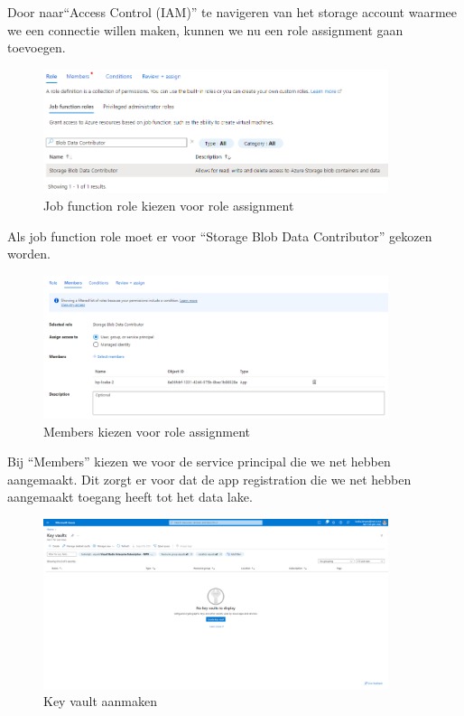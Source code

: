 Door naar``Access Control (IAM)'' te navigeren van het storage account waarmee we een connectie willen maken, kunnen we nu een role assignment gaan toevoegen.

\begin{figure}[H]
    \centering
    \includegraphics[width=0.9\textwidth]{./graphics/databricks/connection_5.png}
    \caption{Job function role kiezen voor role assignment}
\end{figure}

Als job function role moet er voor ``Storage Blob Data Contributor'' gekozen worden.

\begin{figure}[H]
    \centering
    \includegraphics[width=0.9\textwidth]{./graphics/databricks/connection_6.png}
    \caption{Members kiezen voor role assignment}
\end{figure}

Bij ``Members'' kiezen we voor de service principal die we net hebben aangemaakt. Dit zorgt er voor dat de app registration die we net hebben aangemaakt toegang heeft tot het data lake.

\begin{figure}[H]
    \centering
    \includegraphics[width=0.9\textwidth]{./graphics/databricks/connection_7.png}
    \caption{Key vault aanmaken}
\end{figure}

